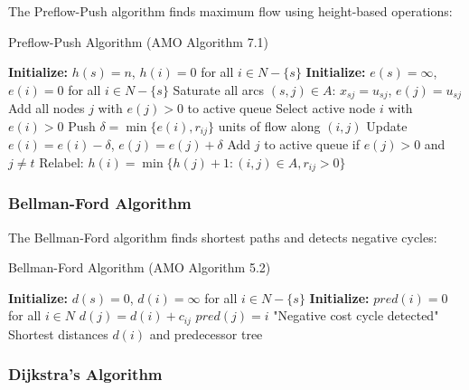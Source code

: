 \documentclass[12pt,a4paper]{article}
\begin{document}
The Preflow-Push algorithm finds maximum flow using height-based operations:

\begin{algorithm}[H]
\caption{Preflow-Push Algorithm (AMO Algorithm 7.1)}
\begin{algorithmic}[1]
\STATE \textbf{Initialize:} $h(s) = n$, $h(i) = 0$ for all $i \in N - \{s\}$
\STATE \textbf{Initialize:} $e(s) = \infty$, $e(i) = 0$ for all $i \in N - \{s\}$
\STATE Saturate all arcs $(s,j) \in A$: $x_{sj} = u_{sj}$, $e(j) = u_{sj}$
\STATE Add all nodes $j$ with $e(j) > 0$ to active queue
    \STATE Select active node $i$ with $e(i) > 0$
        \STATE Push $\delta = \min\{e(i), r_{ij}\}$ units of flow along $(i,j)$
        \STATE Update $e(i) = e(i) - \delta$, $e(j) = e(j) + \delta$
        \STATE Add $j$ to active queue if $e(j) > 0$ and $j \neq t$
    \ENDFOR
        \STATE Relabel: $h(i) = \min\{h(j) + 1 : (i,j) \in A, r_{ij} > 0\}$
    \ENDIF
\ENDWHILE
\end{algorithmic}
\end{algorithm}

\subsubsection{Bellman-Ford Algorithm}

The Bellman-Ford algorithm finds shortest paths and detects negative cycles:

\begin{algorithm}[H]
\caption{Bellman-Ford Algorithm (AMO Algorithm 5.2)}
\begin{algorithmic}[1]
\STATE \textbf{Initialize:} $d(s) = 0$, $d(i) = \infty$ for all $i \in N - \{s\}$
\STATE \textbf{Initialize:} $pred(i) = 0$ for all $i \in N$
            \STATE $d(j) = d(i) + c_{ij}$
            \STATE $pred(j) = i$
        \ENDIF
    \ENDFOR
\ENDFOR
{}
        \RETURN "Negative cost cycle detected"
    \ENDIF
\ENDFOR
\RETURN Shortest distances $d(i)$ and predecessor tree
\end{algorithmic}
\end{algorithm}

\subsubsection{Dijkstra's Algorithm}
\end{document}
